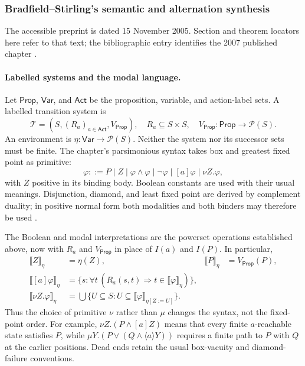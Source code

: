 \subsubsection{Bradfield--Stirling's semantic and alternation synthesis}
\label{sec:p09-n-c-018-bradfield-stirling}

The accessible preprint is dated 15 November 2005.
Section and theorem locators here refer to that text;
the bibliographic entry identifies the 2007 published
chapter \cite{BradfieldStirling2007}.

\paragraph{Labelled systems and the modal language.}
Let \(\mathsf{Prop}\), \(\mathsf{Var}\), and
\(\mathsf{Act}\) be the proposition, variable, and
action-label sets. A labelled transition system is
\[
 \mathcal T=(S,(R_a)_{a\in\mathsf{Act}},V_{\mathsf{Prop}}),
 \quad R_a\subseteq S\times S,\quad
 V_{\mathsf{Prop}}:\mathsf{Prop}\to\mathcal P(S).
\]
An environment is
\(\eta:\mathsf{Var}\to\mathcal P(S)\).
Neither the system nor its successor sets must be finite.
The chapter's parsimonious syntax takes box and
greatest fixed point as primitive:
\[
 \varphi::=P\mid Z\mid\varphi\land\varphi
       \mid\neg\varphi\mid[a]\varphi\mid\nu Z.\varphi,
\]
with \(Z\) positive in its binding body.
Boolean constants are used with their usual meanings.
Disjunction, diamond, and least fixed point are derived
by complement duality; in positive normal form both
modalities and both binders may therefore be used
\cite[\S\S3.1--3.4]{BradfieldStirling2007}.

The Boolean and modal interpretations are the powerset
operations established above, now with \(R_a\) and
\(V_{\mathsf{Prop}}\) in place of \(I(a)\) and \(I(P)\).
In particular,
\[
\begin{aligned}
 \llbracket Z\rrbracket_\eta&=\eta(Z),&
 \llbracket P\rrbracket_\eta&=V_{\mathsf{Prop}}(P),\\
 \llbracket[a]\varphi\rrbracket_\eta
  &=\{s:\forall t\,(R_a(s,t)\Rightarrow
                         t\in\llbracket\varphi\rrbracket_\eta)\},\\
 \llbracket\nu Z.\varphi\rrbracket_\eta
  &=\bigcup\{U\subseteq S:
              U\subseteq\llbracket\varphi\rrbracket_{\eta[Z:=U]}\}.
\end{aligned}
\]
Thus the choice of primitive \(\nu\) rather than
\(\mu\) changes the syntax, not the fixed-point order.
For example,
\(\nu Z.(P\land[a]Z)\) means that every finite
\(a\)-reachable state satisfies \(P\), while
\(\mu Y.(P\lor(Q\land\langle a\rangle Y))\) requires
a finite path to \(P\) with \(Q\) at the earlier
positions. Dead ends retain the usual box-vacuity
and diamond-failure conventions.


